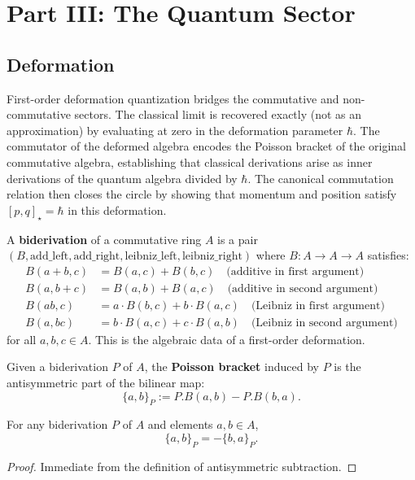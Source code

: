 \section{Part III: The Quantum Sector}

\subsection{Deformation}

First-order deformation quantization bridges the commutative and non-commutative sectors. The classical limit is recovered exactly (not as an approximation) by evaluating at zero in the deformation parameter $\hbar$. The commutator of the deformed algebra encodes the Poisson bracket of the original commutative algebra, establishing that classical derivations arise as inner derivations of the quantum algebra divided by $\hbar$. The canonical commutation relation then closes the circle by showing that momentum and position satisfy $[p, q]_\star = \hbar$ in this deformation.

\begin{definition}
A \textbf{biderivation} of a commutative ring $A$ is a pair $(B, \text{add\_left}, \text{add\_right}, \text{leibniz\_left}, \text{leibniz\_right})$ where $B : A \to A \to A$ satisfies:
\begin{align}
B(a+b,c) &= B(a,c) + B(b,c) \quad \text{(additive in first argument)} \\
B(a,b+c) &= B(a,b) + B(a,c) \quad \text{(additive in second argument)} \\
B(ab,c) &= a \cdot B(b,c) + b \cdot B(a,c) \quad \text{(Leibniz in first argument)} \\
B(a,bc) &= b \cdot B(a,c) + c \cdot B(a,b) \quad \text{(Leibniz in second argument)}
\end{align}
for all $a, b, c \in A$. This is the algebraic data of a first-order deformation.
\end{definition}

\begin{definition}
Given a biderivation $P$ of $A$, the \textbf{Poisson bracket} induced by $P$ is the antisymmetric part of the bilinear map:
\[
\{a, b\}_P := P.B(a,b) - P.B(b,a) .
\]
\end{definition}

\begin{theorem}
For any biderivation $P$ of $A$ and elements $a, b \in A$,
\[
\{a, b\}_P = -\{b, a\}_P .
\]
\begin{proof}
Immediate from the definition of antisymmetric subtraction.
\end{proof}
\end{theorem}

